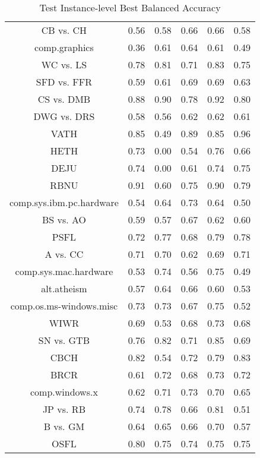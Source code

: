 \begin{table}[ht]\footnotesize
\centering
\caption{Test Instance-level Best Balanced Accuracy}
\label{Table:mil_test_instance_best_balanced_accuracy}
\begin{tabular}{|c|c|c|c|c|c|}
  \hline
          &\MIB{}  &  \rB{}  &  \MB{}  &  \AB{}  &  \AuerB{}\\ 
  \hline
CB vs. CH  &  0.56   &  0.58   &  0.66   &  0.66   &  0.58 \\ 
comp.graphics  &  0.36   &  0.61   &  0.64   &  0.61   &  0.49 \\ 
WC vs. LS  &  0.78   &  0.81   &  0.71   &  0.83   &  0.75 \\ 
SFD vs. FFR  &  0.59   &  0.61   &  0.69   &  0.69   &  0.63 \\ 
CS vs. DMB  &  0.88   &  0.90   &  0.78   &  0.92   &  0.80 \\ 
DWG vs. DRS  &  0.58   &  0.56   &  0.62   &  0.62   &  0.61 \\ 
VATH  &  0.85   &  0.49   &  0.89   &  0.85   &  0.96 \\ 
HETH  &  0.73   &  0.00   &  0.54   &  0.76   &  0.66 \\ 
DEJU  &  0.74   &  0.00   &  0.61   &  0.74   &  0.75 \\ 
RBNU  &  0.91   &  0.60   &  0.75   &  0.90   &  0.79 \\ 
comp.sys.ibm.pc.hardware  &  0.54   &  0.64   &  0.73   &  0.64   &  0.50 \\ 
BS vs. AO  &  0.59   &  0.57   &  0.67   &  0.62   &  0.60 \\ 
PSFL  &  0.72   &  0.77   &  0.68   &  0.79   &  0.78 \\ 
A vs. CC  &  0.71   &  0.70   &  0.62   &  0.69   &  0.71 \\ 
comp.sys.mac.hardware  &  0.53   &  0.74   &  0.56   &  0.75   &  0.49 \\ 
alt.atheism  &  0.57   &  0.64   &  0.66   &  0.60   &  0.53 \\ 
comp.os.ms-windows.misc  &  0.73   &  0.73   &  0.67   &  0.75   &  0.52 \\ 
WIWR  &  0.69   &  0.53   &  0.68   &  0.73   &  0.68 \\ 
SN vs. GTB  &  0.76   &  0.82   &  0.71   &  0.85   &  0.69 \\ 
CBCH  &  0.82   &  0.54   &  0.72   &  0.79   &  0.83 \\ 
BRCR  &  0.61   &  0.72   &  0.68   &  0.73   &  0.72 \\ 
comp.windows.x  &  0.62   &  0.71   &  0.73   &  0.70   &  0.65 \\ 
JP vs. RB  &  0.74   &  0.78   &  0.66   &  0.81   &  0.51 \\ 
B vs. GM  &  0.64   &  0.65   &  0.66   &  0.70   &  0.57 \\ 
OSFL  &  0.80   &  0.75   &  0.74   &  0.75   &  0.75 \\ 
\hline
 \end{tabular}
  \end{table}


